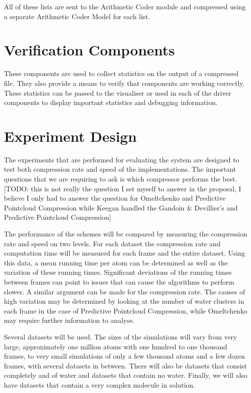 \documentclass[a4paper,11pt]{report}
\begin{document}
All of these lists are sent to the Arithmetic Coder module and compressed using a separate Arithmetic Coder Model for each list. 

\section{Verification Components}
 
These components are used to collect statistics on the output of a compressed file. They also provide a means to verify that components are working correctly. These statistics can be passed to the visualiser or used in each of the driver components to display important statistics and debugging information. 


\section{Experiment Design}

The experiments that are performed for evaluating the system are designed to test both compression rate and speed of the implementations. The important questions that we are requiring to ask is which compressor performs the best. [TODO: this is not really the question I set myself to answer in the proposal, I believe I only had to answer the question for Omeltchenko and Predictive Pointcloud Compression while Keegan handled the Gandoin \& Devillier's and Predictive Pointcloud Compression]

The performance of the schemes will be compared by measuring the compression rate and speed on two levels. For each dataset the compression rate and computation time will be measured for each frame and the entire dataset. Using this data, a mean running time per atom can be determined as well as the variation of these running times. Significant deviations of the running times between frames can point to issues that can cause the algorithms to perform slower. A similar argument can be made for the compression rate. The causes of high variation may be determined by looking at the number of water clusters in each frame in the case of Predictive Pointcloud Compression, while Omeltchenko may require further information to analyse.

Several datasets will be used. The sizes of the simulations will vary from very large, approximately one million atoms with one hundred to one thousand frames, to very small simulations of only a few thousand atoms and a few dozen frames, with several datasets in between. There will also be datasets that consist completely and of water and datasets that contain no water. Finally, we will also have datasets that contain a very complex molecule in solution.


\end{document}
